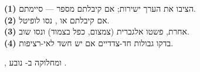 \begin{keybox}[frametitle={ארבעה צעדים לחישוב גבול}]
\small \textbf{(1)} הציבו את הערך ישירות; אם קיבלתם מספר — סיימתם.\\
\textbf{(2)} אם קיבלתם  או \en{$\infty/\infty$}, נסו לופיטל.\\
\textbf{(3)} אחרת, פשטו אלגברית (צמצום, כפל בצמוד) ונסו שוב.\\
\textbf{(4)} בדקו גבולות חד-צדדיים אם יש חשד לאי-רציפות.
\end{keybox}
\medskip

\begin{notebox}[nobreak=true,frametitle={זהות שימושית}]
\small {}, ומחלוקה ב-\en{$\cos^2\theta$} נובע
.
\end{notebox}


